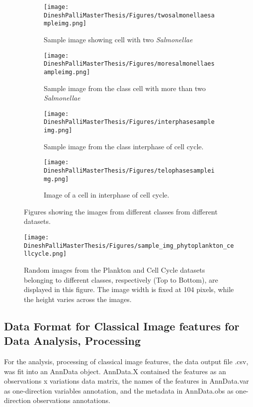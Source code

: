 \documentclass[12pt,a4paper]{article}
\begin{document}
\begin{figure}
  \centering
  \begin{subfigure}{\linewidth}
    \texttt{[image: DineshPalliMasterThesis/Figures/twosalmonellaesampleimg.png]}
    \caption{Sample image showing cell with two \textit{Salmonellae}}
    \label{sampleimg:twosalm}
  \end{subfigure}
  \hfill
  \begin{subfigure}{\linewidth}
    \texttt{[image: DineshPalliMasterThesis/Figures/moresalmonellaesampleimg.png]}
    \caption{Sample image from the class cell with more than two \textit{Salmonellae}}
    \label{sampleimg:moresalm}
  \end{subfigure}
  \hfill
  \begin{subfigure}{\linewidth}
    \texttt{[image: DineshPalliMasterThesis/Figures/interphasesampleimg.png]}
    \caption{Sample image from the class interphase of cell cycle.}
    \label{sampleimg:interphase}
  \end{subfigure}
  \hfill
  \begin{subfigure}{\linewidth}
    \texttt{[image: DineshPalliMasterThesis/Figures/telophasesampleimg.png]}
    \caption{Image of a cell in interphase of cell cycle.}
    \label{sampleimg:telophase}
  \end{subfigure}  
  \caption[Sample images from different classes from \textit{Salmonella} and Cell Cycle datasets]{Figures showing the images from different classes from different datasets.}
  \label{sampleimgs}
\end{figure}

\begin{figure}
  \centering
  \texttt{[image: DineshPalliMasterThesis/Figures/sample\_img\_phytoplankton\_cellcycle.png]}
  \caption[Images from Plankton and Cell Cycle datasets from multiple classes showing dimensions]{Random images from the Plankton and Cell Cycle datasets belonging to different classes, respectively (Top to Bottom), are displayed in this figure. The image width is fixed at 104 pixels, while the height varies across the images.}
  \label{sampleimgs}
\end{figure}

\subsection{Data Format for Classical Image features for Data Analysis, Processing}
\label{adata_scanpy}
For the analysis, processing of classical image features, the data output file .csv, was fit into an AnnData object. AnnData.X contained the features as an observations x variations data matrix, the names of the features in AnnData.var as one-direction variables annotation, and the metadata in AnnData.obs as one-direction observations annotations.
\end{document}
